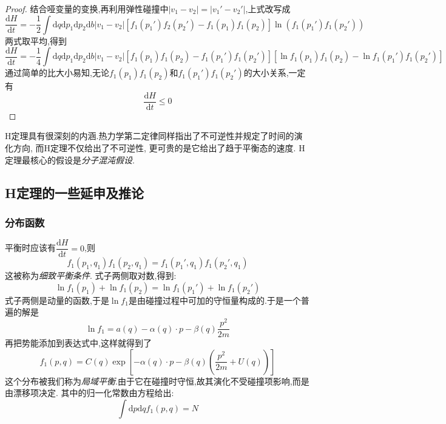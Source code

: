 \begin{proof}
      结合哑变量的变换,再利用弹性碰撞中$\left\vert v_1-v_2 \right\vert =\left\vert v_1'-v_2' \right\vert $,上式改写成
      \[\dfrac{\mathrm{d}H}{\mathrm{d} t}=-\frac{1}{2}\int \mathrm{d} q \mathrm{d} p_1 \mathrm{d}  p_2 \mathrm{d} b \left\vert v_1- v_2 \right\vert \left[ f_1(p_1')f_2(p_2')-f_1(p_1)f_1(p_2) \right] \ln(f_1(p_1')f_1(p_2')) \]
      两式取平均,得到
      \begin{equation}
        \dfrac{\mathrm{d}H}{\mathrm{d} t}=-\frac{1}{4}\int \mathrm{d} q \mathrm{d} p_1 \mathrm{d} p_2 \mathrm{d} b \left\vert v_1-v_2 \right\vert \left[ f_1(p_1)f_1(p_2)-f_1(p_1')f_1(p_2')\right] \left[ \ln f_1(p_1)f_1(p_2)-\ln f_1(p_1')f_1(p_2') \right] 
      \end{equation}
      通过简单的比大小易知,无论$f_1(p_1)f_1(p_2)$和$f_1(p_1')f_1(p_2')$的大小关系,一定有
      \begin{equation}
        \dfrac{\mathrm{d}H}{\mathrm{d} t}\le 0
      \end{equation}
    \end{proof}

    H定理具有很深刻的内涵.热力学第二定律同样指出了不可逆性并规定了时间的演化方向, 而H定理不仅给出了不可逆性, 更可贵的是它给出了趋于平衡态的速度. H定理最核心的假设是\emph{分子混沌假设}.

\subsection{H定理的一些延申及推论}
\subsubsection*{分布函数}
    平衡时应该有$\dfrac{\mathrm{d}H}{\mathrm{d} t}=0$,则 
    \begin{equation}
      f_1(p_1,q_1)f_1(p_2,q_1)=f_1(p_1',q_1)f_1(p_2',q_1)
    \end{equation}
    这被称为\emph{细致平衡条件}. 式子两侧取对数,得到:
    \begin{equation}
      \ln f_1(p_1)+\ln f_1(p_2)=\ln f_1(p_1')+ \ln f_1(p_2')
    \end{equation}
    式子两侧是动量的函数,于是$\ln f_1$是由碰撞过程中可加的守恒量构成的.于是一个普遍的解是
    \begin{equation}
      \ln f_1= a(q)-\alpha(q) \cdot p -\beta(q) \frac{p^{2}}{2m}
    \end{equation}
    再把势能添加到表达式中,这样就得到了
    \begin{equation}
      f_1(p,q)=C(q) \exp\left[ -\alpha(q)\cdot p -\beta(q) \left( \frac{p^{2}}{2m}+U(q) \right)  \right] 
    \end{equation}
    这个分布被我们称为\emph{局域平衡}.由于它在碰撞时守恒,故其演化不受碰撞项影响,而是由漂移项决定. 其中的归一化常数由方程给出:
    \begin{equation}
      \int \mathrm{d} p \mathrm{d} q f_1(p,q)=N
    \end{equation}
      
